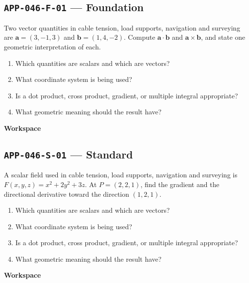 \documentclass[11pt]{book}
\newcommand{\pid}[1]{\texttt{#1}}
\newcommand{\workspace}{\par\vspace{0.7in}\hrulefill\par\vspace{0.55in}\hrulefill\par}
\begin{document}
\subsection*{\pid{APP-046-F-01} — Foundation}
\begin{problembox}
Two vector quantities in cable tension, load supports, navigation and surveying are $\mathbf a=(3,-1,3)$ and $\mathbf b=(1,4,-2)$. Compute $\mathbf a\cdot\mathbf b$ and $\mathbf a\times\mathbf b$, and state one geometric interpretation of each.
\end{problembox}
\begin{promptbox}\begin{enumerate}
\item Which quantities are scalars and which are vectors?
\item What coordinate system is being used?
\item Is a dot product, cross product, gradient, or multiple integral appropriate?
\item What geometric meaning should the result have?
\end{enumerate}\end{promptbox}
\textbf{Workspace}\workspace
{}
\subsection*{\pid{APP-046-S-01} — Standard}
\begin{problembox}
A scalar field used in cable tension, load supports, navigation and surveying is $F(x,y,z)=x^2+2y^2+3z$. At $P=(2,2,1)$, find the gradient and the directional derivative toward the direction $(1,2,1)$.
\end{problembox}
\begin{promptbox}\begin{enumerate}
\item Which quantities are scalars and which are vectors?
\item What coordinate system is being used?
\item Is a dot product, cross product, gradient, or multiple integral appropriate?
\item What geometric meaning should the result have?
\end{enumerate}\end{promptbox}
\textbf{Workspace}\workspace
{}
\end{document}
